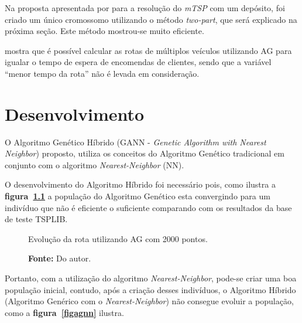 \documentclass[12pt,openright,a4paper,twoside]{tcc}
\begin{document}
			Na proposta  apresentada por  para a resolução do \textit{mTSP} com um depósito, foi criado um único cromossomo utilizando o método \textit{two-part}, que será explicado na próxima seção. Este método mostrou-se muito eficiente.

			  mostra que é possível calcular as rotas de múltiplos veículos utilizando AG para igualar o tempo 
			de espera de encomendas de clientes, sendo que a variável ``menor tempo da rota'' não é levada em consideração.

		
	
		\chapter{Desenvolvimento}
		
		O Algoritmo Genético Híbrido (GANN - \textit{Genetic Algorithm with Nearest Neighbor}) proposto, utiliza os conceitos do Algoritmo Genético tradicional em conjunto com o algoritmo  \textit{Nearest-Neighbor} (NN).

		O desenvolvimento do Algoritmo Híbrido foi necessário pois, como ilustra a \textbf{figura~\ref{graf-agestag}}  a população do Algoritmo Genético esta convergindo para um indivíduo que não é eficiente o suficiente comparando com os resultados da base de teste TSPLIB.  

		\begin{figure}[h]
			\centering
            \caption{Evolução da rota utilizando AG com 2000 pontos.}
            \caption*{\textbf{Fonte:} Do autor.}
			\label{graf-agestag}
		\end{figure}

		Portanto, com a utilização do algoritmo \textit{Nearest-Neighbor}, pode-se criar uma boa população inicial, contudo, após a criação desses indivíduos, o Algoritmo Híbrido (Algoritmo Genérico com o  \textit{Nearest-Neighbor}) não consegue evoluir a população, como a \textbf{figura~\ref{figagnn}} ilustra.  
\end{document}
